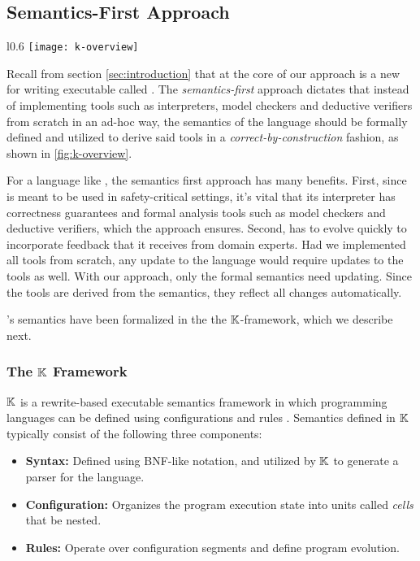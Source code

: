 \subsection{Semantics-First Approach}\label{subsec:semantics-first}
\begin{wrapfigure}{l}{0.6\textwidth}
  \centering
  \texttt{[image: k-overview]}
  \caption{\emph{Semantics-first} Approach} \label{fig:k-overview}
\end{wrapfigure}
Recall from section \ref{sec:introduction} that at the core of our approach
is a new \DSL{} for writing executable \BPGs{} called \MediK{}.
The \emph{semantics-first} approach dictates that instead of
implementing tools such as interpreters, model checkers and deductive verifiers
from scratch in an ad-hoc way, the semantics of the language should
be formally defined and utilized to derive said tools in a
\emph{correct-by-construction} fashion, as shown in \figurename{} \ref{fig:k-overview}.

For a language like \MediK{}, the semantics first approach has many benefits. First,
since \MediK{} is meant to be used in safety-critical settings,
it's vital that its interpreter has correctness guarantees and formal analysis
tools such as model checkers and deductive verifiers, which the approach ensures.
Second, \MediK{} has to evolve quickly to incorporate feedback that it receives from domain experts.
Had we implemented all tools from scratch, any update to the language would
require updates to the tools as well. With our approach, only the formal semantics
need updating. Since the tools are derived from the semantics, they reflect all
changes automatically.

\MediK{}'s semantics have been formalized in the the $\mathbb{K}{}$-framework, which
we describe next.

\subsubsection{The $\mathbb{K}{}$ Framework}
$\mathbb{K}$ is a rewrite-based executable semantics framework in which
programming languages can be defined
using configurations and rules \cite{KFrameworkURL}. Semantics
defined in $\mathbb{K}$ typically consist of the following three components:
\begin{itemize}
  \item \textbf{Syntax:} Defined using BNF-like notation, and utilized
    by $\mathbb{K}{}$ to generate a parser for the language.
  \item \textbf{Configuration:} Organizes the program execution state into
    units called \emph{cells} that be nested.
  \item \textbf{Rules:} Operate over configuration segments and define
    program evolution.
\end{itemize}

